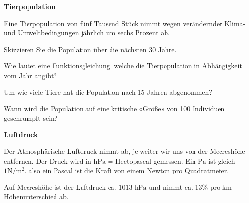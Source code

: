 

\bbwActAufgabenNr{} \textbf{Tierpopulation}

Eine Tierpopulation von fünf Tausend Stück nimmt wegen verändernder Klima-
und Umweltbedingungen jährlich um sechs Prozent ab.


\begin{bbwAufgabenBlock}

\item Skizzieren Sie die Population über die nächsten 30 Jahre.
\item Wie lautet eine Funktionsgleichung, welche die Tierpopulation in
  Abhängigkeit vom Jahr angibt?
\item Um wie viele Tiere hat die Population nach 15 Jahren abgenommen?


  

\item Wann wird die Population auf eine kritische «Größe» von 100
  Individuen geschrumpft sein?
\end{bbwAufgabenBlock}
\platzFuerBerechnungenBisEndeSeite{}


\bbwActAufgabenNr{} \textbf{Luftdruck}

Der Atmosphärische Luftdruck nimmt ab, je weiter wir uns von der
Meereshöhe entfernen. Der Druck wird in $\textrm{hPa}$ = Hectopascal
gemessen. Ein $\textrm{Pa}$ ist gleich $1 \textrm{N}/\textrm{m}^2$, also ein
Pascal ist die Kraft von einem Newton pro Quadratmeter.

Auf Meereshöhe ist der Luftdruck ca. $ 1013 \textrm{ hPa}$ und nimmt
ca. 13\% pro km Höhenunterschied ab.

